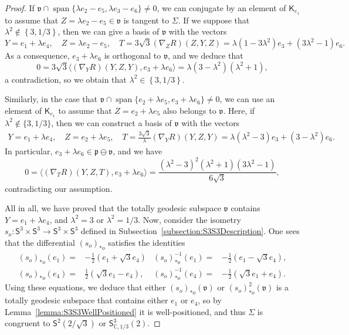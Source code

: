 \documentclass[11pt,a4paper,final]{amsart}
\newcommand{\s}{\mathsf}
\newcommand{\g}{\mathfrak}
\newcommand{\C}{\mathbb{C}}
\newcommand{\vecspan}{\operatorname{span}}
\theoremstyle{definition}
\begin{document}
\begin{proof}
	If $\g{v}\cap\vecspan\{\lambda e_{2}-e_{5},\lambda e_{3}-e_{6}\} \neq 0$, we can conjugate by an element of $\mathsf{K}_{e_{1}}$ to assume that $Z=\lambda e_{2}-e_{5}\in \g{v}$ is tangent to $\Sigma$.
	If we suppose that $\lambda^{2}\notin \left\{3,1/3\right\}$, then we can give a basis of $\g{v}$ with the vectors
	\begin{equation*}
		Y=e_{1}+\lambda e_{4}, \quad
		Z=\lambda e_{2}-e_{5}, \quad
		T=3\sqrt{3} (\nabla_{Z}R)(Z,Y,Z)=\lambda(1-3\lambda^{2})e_{3}+(3\lambda^{2}-1)e_{6}.
	\end{equation*}
	As a consequence, $e_{3}+\lambda e_{6}$ is orthogonal to $\g{v}$, and we deduce that
	\[
		0={3 \sqrt{3}}\langle (\nabla_{Y}R)(Y,Z,Y) ,e_{3}+\lambda e_{6} \rangle=\lambda  \left(3-\lambda^{2}\right) \left(\lambda^2+1\right),
	\]
	a contradiction, so we obtain that $\lambda^{2}\in \left\{3,1/3\right\}$.
		
	Similarly, in the case that $\g{v}\cap \vecspan\{e_{2}+\lambda e_{5},e_{3}+\lambda e_{6}\}\neq 0$, we can use an element of $\mathsf{K}_{e_{1}}$ to assume that $Z=e_{2}+\lambda e_{5}$ also belongs to $\g{v}$.
	Here, if $\lambda^{2}\notin \{3,1/3\}$, then we can construct a basis of $\g{v}$ with the vectors
	\begin{align*}
		Y=e_{1}+\lambda e_{4}, \quad
		Z=e_{2}+\lambda e_{5}, \quad
		T=\frac{3\sqrt{3}}{\lambda}(\nabla_{Y}R)(Y,Z,Y)=\lambda(\lambda^{2}-3)e_{3}+(3-\lambda^{2})e_{6}.
	\end{align*}
	In particular, $e_{3}+\lambda e_{6}\in \g{p}\ominus \g{v}$, and we have
	\[
		0=\langle (\nabla_{T}R)(Y,Z,T),e_{3}+\lambda e_{6} \rangle=\frac{\left(\lambda ^2-3\right)^2 \left(\lambda ^2+1\right) \left(3 \lambda^2-1\right)}{6 \sqrt{3}},
	\]
	contradicting our assumption.
		
	All in all, we have proved that the totally geodesic subspace $\g{v}$ contains $Y=e_{1}+\lambda e_{4}$, and $\lambda^{2}=3$ or $\lambda^{2}=1/3$.
	Now, consider the isometry $s_o\colon \s{S}^{3}\times\s{S}^{3}\to\s{S}^{3}\times\s{S}^{3}$ defined in Subsection~\ref{subsection:S3S3Description}.
	One sees that the differential $(s_o)_{*o}$ satisfies the identities
	\begin{align*}
		(s_{o})_{*o} (e_{1})={}&-\frac{1}{2}(e_{1}+\sqrt{3}e_{4}) & (s_{o})_{*o}^{-1} (e_{1})={}&-\frac{1}{2}(e_{1}-\sqrt{3}e_{4}), \\
		(s_{o})_{*o} (e_{4})={}&\frac{1}{2}(\sqrt{3}e_{1}-e_{4}), & (s_{o})_{*o}^{-1}(e_{4})={}&-\frac{1}{2}(\sqrt{3}e_{1}+e_{4}).
	\end{align*}
	Using these equations, we deduce that either $(s_{o})_{*o} (\g{v})$ or $(s_{o})_{*o}^{2}(\g{v})$ is a totally geodesic subspace that contains either $e_{1}$ or $e_{4}$, so by Lemma~\ref{lemma:S3S3WellPositioned} it is well-positioned, and thus $\Sigma$ is congruent to $\mathsf{S}^{2}(2/\sqrt{3})$ or $\mathsf{S}^{3}_{\C,1/3}(2)$. \qedhere
\end{proof}
	
\end{document}
